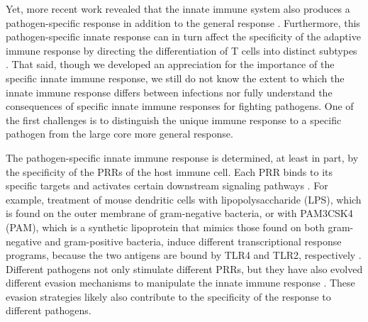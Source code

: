 Yet, more recent work revealed that the innate immune system also
produces a pathogen-specific response in addition to the general
response \citep{Huang2001, Boldrick2002, Nau2002, Jenner2005}.
Furthermore, this pathogen-specific innate response can in turn affect
the specificity of the adaptive immune response by directing the
differentiation of T cells into distinct subtypes \citep{Iwasaki2004}.
That said, though we developed an appreciation for the importance of the
specific innate immune response, we still do not know the extent to
which the innate immune response differs between infections nor fully
understand the consequences of specific innate immune responses for
fighting pathogens. One of the first challenges is to distinguish the
unique immune response to a specific pathogen from the large core more
general response.

The pathogen-specific innate immune response is determined, at least in
part, by the specificity of the PRRs of the host immune cell. Each PRR
binds to its specific targets and activates certain downstream signaling
pathways \citep{Kawai2009}. For example, treatment of mouse dendritic
cells with lipopolysaccharide (LPS), which is found on the outer
membrane of gram-negative bacteria, or with PAM3CSK4 (PAM), which is a
synthetic lipoprotein that mimics those found on both gram-negative and
gram-positive bacteria, induce different transcriptional response
programs, because the two antigens are bound by TLR4 and TLR2,
respectively \citep{Amit2009}. Different pathogens not only stimulate
different PRRs, but they have also evolved different evasion mechanisms
to manipulate the innate immune response \citep{Mogensen2009, Hornef2002,
Brodsky2009, Diacovich2010}. These evasion strategies likely also
contribute to the specificity of the response to different pathogens.

